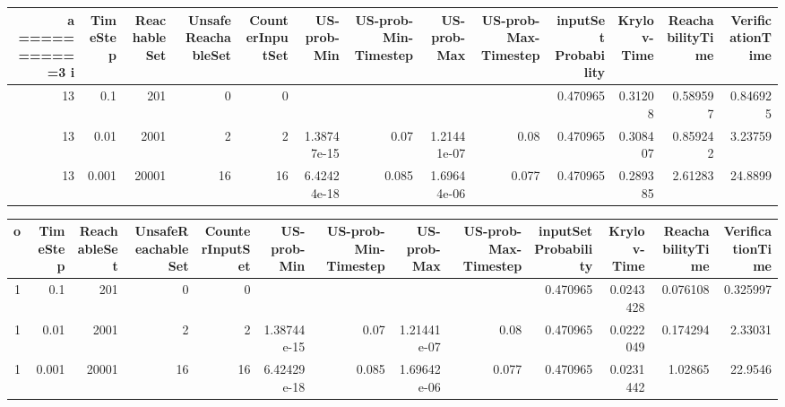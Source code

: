 \begin{tabular}{rrrrrrrrrrrrr}
\hline a ===========3 
   i &   TimeStep &   ReachableSet &   UnsafeReachableSet &   CounterInputSet &   US-prob-Min &   US-prob-Min-Timestep &   US-prob-Max &   US-prob-Max-Timestep &   inputSet Probability &   Krylov-Time &   ReachabilityTime &   VerificationTime \\
\hline
  13 &      0.1   &            201 &                    0 &                 0 &               &                        &               &                        &               0.470965 &      0.31208  &           0.589597 &           0.846925 \\
  13 &      0.01  &           2001 &                    2 &                 2 &   1.38747e-15 &                  0.07  &   1.21441e-07 &                  0.08  &               0.470965 &      0.308407 &           0.859242 &           3.23759  \\
  13 &      0.001 &          20001 &                   16 &                16 &   6.42424e-18 &                  0.085 &   1.69644e-06 &                  0.077 &               0.470965 &      0.289385 &           2.61283  &          24.8899   \\
\hline
\end{tabular}
\begin{tabular}{rrrrrrrrrrrrr}
\hline
   o &   TimeStep &   ReachableSet &   UnsafeReachableSet &   CounterInputSet &   US-prob-Min &   US-prob-Min-Timestep &   US-prob-Max &   US-prob-Max-Timestep &   inputSet Probability &   Krylov-Time &   ReachabilityTime &   VerificationTime \\
\hline
   1 &      0.1   &            201 &                    0 &                 0 &               &                        &               &                        &               0.470965 &     0.0243428 &           0.076108 &           0.325997 \\
   1 &      0.01  &           2001 &                    2 &                 2 &   1.38744e-15 &                  0.07  &   1.21441e-07 &                  0.08  &               0.470965 &     0.0222049 &           0.174294 &           2.33031  \\
   1 &      0.001 &          20001 &                   16 &                16 &   6.42429e-18 &                  0.085 &   1.69642e-06 &                  0.077 &               0.470965 &     0.0231442 &           1.02865  &          22.9546   \\
\hline
\end{tabular}

